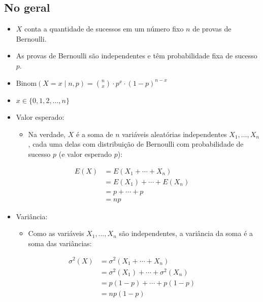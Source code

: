 \documentclass[
  11pt]{report}
\providecommand{\tightlist}{%
  \setlength{\itemsep}{0pt}\setlength{\parskip}{0pt}}
\begin{document}
\hypertarget{no-geral-4}{%
\subsection{No geral}\label{no-geral-4}}

\begin{itemize}
\item
  $X$ conta a quantidade de sucessos em um número fixo $n$ de provas de Bernoulli.
\item
  As provas de Bernoulli são independentes e têm probabilidade fixa de sucesso $p$.
\item
  $\text{Binom}(X = x \mid n, p) = {n \choose x} \cdot p^x \cdot (1 - p)^{n - x}$
\item
  $x \in \{ 0, 1, 2, \ldots, n\}$
\item
  Valor esperado:

  \begin{itemize}
  \tightlist
  \item
    Na verdade, $X$ é a soma de $n$ variáveis aleatórias independentes $X_1, \ldots, X_n$, cada uma delas com distribuição de Bernoulli com probabilidade de sucesso $p$ (e valor esperado $p$):
  \end{itemize}
\end{itemize}

\[
  \begin{aligned}
    E(X) &= E(X_1 + \cdots + X_n) \\ 
         &= E(X_1) + \cdots + E(X_n) \\
         &= p + \cdots + p \\
         &= np
  \end{aligned}
\]

\begin{itemize}
\item
  Variância:

  \begin{itemize}
  \tightlist
  \item
    Como as variáveis $X_1, \ldots, X_n$ são independentes, a variância da soma é a soma das variâncias:
  \end{itemize}
\end{itemize}

\[
  \begin{aligned}
    \sigma^2(X) &= \sigma^2(X_1 + \cdots + X_n) \\ 
         &= \sigma^2(X_1) + \cdots + \sigma^2(X_n) \\
         &= p(1-p) + \cdots + p(1-p) \\
         &= np(1-p)
  \end{aligned}
\]
\end{document}
